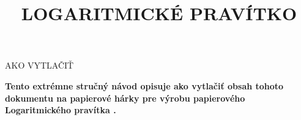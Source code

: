 
\newcommand{\makefulltitle}{Ako vytlačiť Logaritmické pravítko }



\title{\fontsize{60}{60}\selectfont LOGARITMICKÉ PRAVÍTKO}
\preauthor{}\postauthor{}\author{}
\predate{}\postdate{}\date{}


  \begin{center}
    \headingfont\fontsize{20}{20}\selectfont AKO VYTLAČIŤ
  \end{center}

  {\let\newpage\relax\maketitle}%
  \nosection{}
  \large\textbf{\makeperex Tento extrémne stručný návod opisuje ako vytlačiť obsah tohoto dokumentu na papierové hárky pre výrobu papierového Logaritmického pravítka \modelname.}

